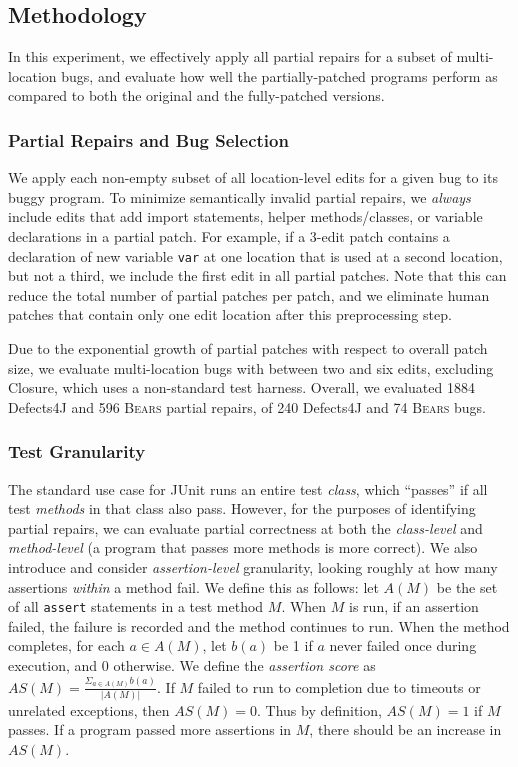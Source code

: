 \documentclass[10pt, conference]{IEEEtran}
\newcommand\bears{\textsc{Bears}\xspace}
\begin{document}
\subsection{Methodology}
\label{sec:partial-repair-methodology}

In this experiment, we effectively apply all partial repairs for
a subset of multi-location bugs, and
evaluate how well the partially-patched programs perform 
as compared to both the original and the fully-patched versions. 

\subsubsection{Partial Repairs and Bug Selection}
We apply each non-empty subset of all location-level edits for a given bug to
its buggy program.  To minimize semantically invalid partial repairs, we \emph{always}
include edits that add import statements, helper methods/classes, or variable declarations
in a partial patch. 
For example, if a 3-edit patch contains a declaration of new variable
\texttt{var} at one location that is used at a second location, but not a third,
we include the first edit in all partial patches.  Note that this can reduce the total
number of partial patches per patch, and we eliminate
human patches that contain only 
one edit location after this preprocessing step. 

Due to the exponential growth of partial patches with respect to overall patch size,
we evaluate multi-location bugs with
between two and six edits, excluding Closure, which uses a
non-standard test harness. 
Overall, we evaluated 1884 Defects4J and 596 \bears partial repairs,
of 240 Defects4J and 74 \bears bugs.

\subsubsection{Test Granularity}

The standard use case for JUnit runs
an entire test \emph{class}, which ``passes'' if all test \emph{methods} in
that class also pass.  However, for the purposes of identifying partial repairs,
we can evaluate partial correctness at both the \emph{class-level} and
\emph{method-level} (a program that passes more methods is more
correct).
We also introduce and consider \emph{assertion-level} granularity, looking
roughly at how many assertions \emph{within} a method fail.  We define this as follows:
let $A(M)$ be the set of all \texttt{assert}
statements in a test method $M$. 
When $M$ is run, if an assertion failed, the failure is recorded and the method 
continues to run.  When the method completes, for each
$a\in A(M)$, let $b(a)$ be 1 if $a$ never failed once during execution,
and 0 otherwise. We define the \emph{assertion score} as
$AS(M)=\frac{\Sigma_{a\in A(M)}b(a)}{|A(M)|}$. If $M$ failed to run to completion 
due to timeouts or unrelated exceptions, then
$AS(M)=0$. Thus by definition, $AS(M)=1$ if $M$ passes. If a program passed more 
assertions in $M$, there should be an increase in $AS(M)$.
\end{document}
